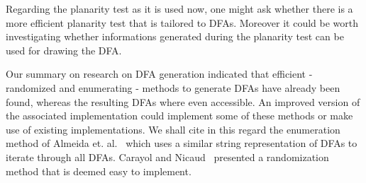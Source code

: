 Regarding the planarity test as it is used now, one might ask whether there is a more efficient planarity test that is tailored to DFAs. Moreover it could be worth investigating whether informations generated during the planarity test can be used for drawing the DFA.

Our summary on research on DFA generation indicated that efficient - randomized and enumerating - methods to generate DFAs have already been found, whereas the resulting DFAs where even accessible. An improved version of the associated implementation could implement some of these methods or make use of existing implementations. We shall cite in this regard the enumeration method of Almeida et. al.~\cite{AAA09} which uses a similar string representation of DFAs to iterate through all DFAs. Carayol and Nicaud~\cite{CN12} presented a randomization method that is deemed easy to implement.

